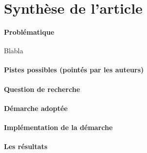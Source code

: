 \section{Synthèse de l'article}

\paragraph{Problématique}

Blabla

\paragraph{Pistes possibles (pointés par les auteurs)}
\lipsum[1]

\paragraph{Question de recherche}
\lipsum[1]

\paragraph{Démarche adoptée}
\lipsum[1]

\paragraph{Implémentation de la démarche}
\lipsum[1]

\paragraph{Les résultats}
\lipsum[1]
